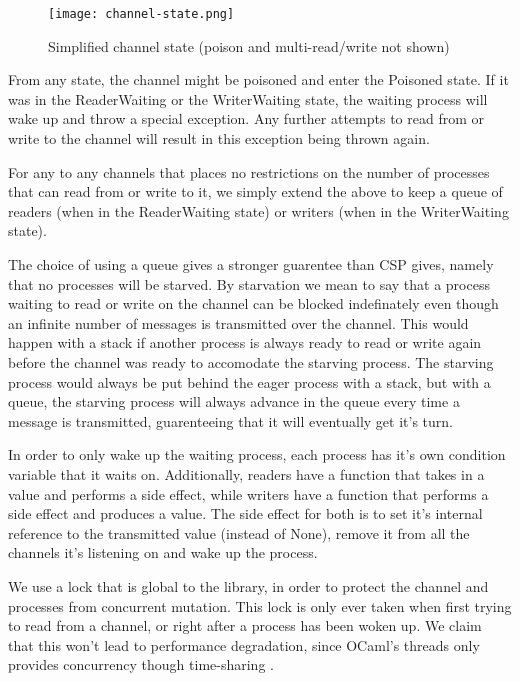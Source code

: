 \documentclass[11pt,oneside,a4paper]{article}
\begin{document}
\begin{figure}[h]
\centering
\texttt{[image: channel-state.png]}
\caption{Simplified channel state (poison and multi-read/write not shown)}
\label{channel-state}
\end{figure}

From any state, the channel might be poisoned and enter the Poisoned state. If it was in the
ReaderWaiting or the WriterWaiting state, the waiting process will wake up and throw a special
exception. Any further attempts to read from or write to the channel will result in this 
exception being thrown again.

For any to any channels that places no restrictions on the number of processes that can read
from or write to it, we simply extend the above to keep a queue of readers (when in the 
ReaderWaiting state) or writers (when in the WriterWaiting state).

The choice of using a queue gives a stronger guarentee than CSP gives, namely that no processes
will be starved. By starvation we mean to say that a process waiting to read or write on the
channel can be blocked indefinately even though an infinite number of messages is transmitted
over the channel. This would happen with a stack if another process is always ready to read or 
write again before the channel was ready to accomodate the starving process. The starving process
would always be put behind the eager process with a stack, but with a queue, the starving process
will always advance in the queue every time a message is transmitted, guarenteeing that it will
eventually get it's turn.

In order to only wake up the waiting process, each process has it's own condition variable that
it waits on. Additionally, readers have a function that takes in a value and performs a side 
effect, while writers have a function that performs a side effect and produces a value. The side
effect for both is to set it's internal reference to the transmitted value (instead of None),
remove it from all the channels it's listening on and wake up the process.

We use a lock that is global to the library, in order to protect the channel and processes from
concurrent mutation. This lock is only ever taken when first trying to read from a channel, or
right after a process has been woken up. We claim that this won't lead to performance degradation,
since OCaml's threads only provides concurrency though time-sharing \cite{ocaml-threads}.
\end{document}
